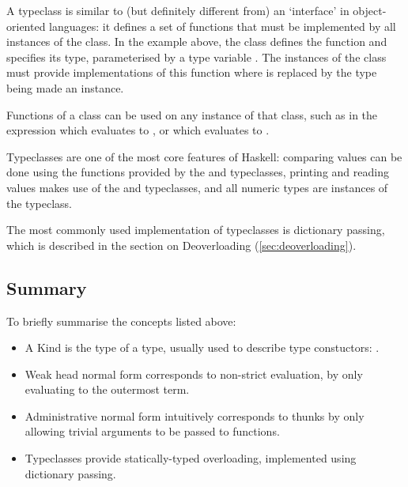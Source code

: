 \documentclass[dissertation.tex]{subfiles}
\begin{document}
{{        A typeclass is similar to (but definitely different from) an `interface' in object-oriented languages: it defines a set of functions that must be implemented by all instances of the class. In the example above, the  class defines the  function and specifies its type, parameterised by a type variable . The instances of the class must provide implementations of this function where  is replaced by the type being made an instance.

        Functions of a class can be used on any instance of that class, such as in the expression  which evaluates to \haskell{[2,4,6]}, or  which evaluates to .

        Typeclasses are one of the most core features of Haskell: comparing values can be done using the functions provided by the  and  typeclasses, printing and reading values makes use of the  and  typeclasses, and all numeric types are instances of the  typeclass. 

        The most commonly used implementation of typeclasses is dictionary passing, which is described in the section on Deoverloading (\ref{sec:deoverloading}).
    }
    \subsection{Summary}
    {
        To briefly summarise the concepts listed above:

        \begin{itemize}
        \item A Kind is the type of a type, usually used to describe type constuctors: .
        \item Weak head normal form corresponds to non-strict evaluation, by only evaluating to the outermost term.
        \item
        {
            Administrative normal form intuitively corresponds to thunks by only allowing trivial arguments to be
            passed to functions.
        }
        \item Typeclasses provide statically-typed overloading, implemented using dictionary passing.
        \end{itemize}
    }
}
\end{document}
